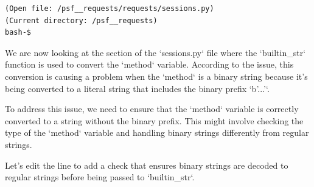 {\begin{observationbox}
\begin{Verbatim}[breaklines=true, breakanywhere=true]
(Open file: /psf__requests/requests/sessions.py)
(Current directory: /psf__requests)
bash-$
\end{Verbatim}
\end{observationbox}
\begin{agentbox}
We are now looking at the section of the `sessions.py` file where the `builtin\_str` function is used to convert the `method` variable. According to the issue, this conversion is causing a problem when the `method` is a binary string because it's being converted to a literal string that includes the binary prefix `b'...'`.



To address this issue, we need to ensure that the `method` variable is correctly converted to a string without the binary prefix. This might involve checking the type of the `method` variable and handling binary strings differently from regular strings.



Let's edit the line to add a check that ensures binary strings are decoded to regular strings before being passed to `builtin\_str`.


\end{agentbox}}

